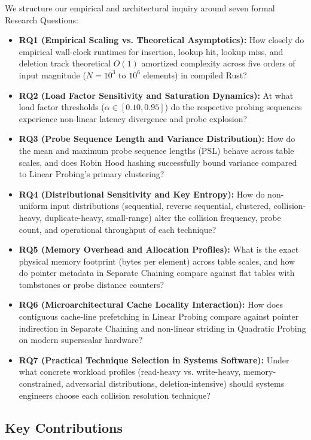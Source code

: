 \documentclass[conference]{IEEEtran}
\begin{document}
We structure our empirical and architectural inquiry around seven formal Research Questions:
\begin{itemize}
  \item \textbf{RQ1 (Empirical Scaling vs. Theoretical Asymptotics):} How closely do empirical wall-clock runtimes for insertion, lookup hit, lookup miss, and deletion track theoretical $O(1)$ amortized complexity across five orders of input magnitude ($N = 10^3$ to $10^6$ elements) in compiled Rust?
  \item \textbf{RQ2 (Load Factor Sensitivity and Saturation Dynamics):} At what load factor thresholds ($\alpha \in [0.10, 0.95]$) do the respective probing sequences experience non-linear latency divergence and probe explosion?
  \item \textbf{RQ3 (Probe Sequence Length and Variance Distribution):} How do the mean and maximum probe sequence lengths (PSL) behave across table scales, and does Robin Hood hashing successfully bound variance compared to Linear Probing's primary clustering?
  \item \textbf{RQ4 (Distributional Sensitivity and Key Entropy):} How do non-uniform input distributions (sequential, reverse sequential, clustered, collision-heavy, duplicate-heavy, small-range) alter the collision frequency, probe count, and operational throughput of each technique?
  \item \textbf{RQ5 (Memory Overhead and Allocation Profiles):} What is the exact physical memory footprint (bytes per element) across table scales, and how do pointer metadata in Separate Chaining compare against flat tables with tombstones or probe distance counters?
  \item \textbf{RQ6 (Microarchitectural Cache Locality Interaction):} How does contiguous cache-line prefetching in Linear Probing compare against pointer indirection in Separate Chaining and non-linear striding in Quadratic Probing on modern superscalar hardware?
  \item \textbf{RQ7 (Practical Technique Selection in Systems Software):} Under what concrete workload profiles (read-heavy vs. write-heavy, memory-constrained, adversarial distributions, deletion-intensive) should systems engineers choose each collision resolution technique?
\end{itemize}

\subsection{Key Contributions}
\end{document}
